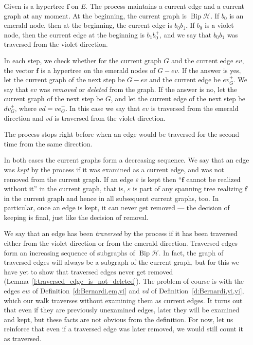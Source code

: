 \documentclass[ALCO,ThmDefs,Unicode,epreuves]{cedram}
\newcommand{\HH}{\mathcal H}
\DeclareMathOperator{\bip}{Bip}
\begin{document}
\begin{defi}
\label{d:Bernardi,vi,vi}
Given is a hypertree $\mathbf f$ on $E$. The process maintains a current edge and a current graph at any moment. At the beginning, the current graph is $\bip \HH$. If $b_0$ is an emerald node, then at the beginning, the current edge is $b_0b_1$. If $b_0$ is a violet node, then the current edge at the beginning is $b_1b_0^+$, and we say that $b_0b_1$ was traversed from the violet direction.

In each step, we check whether for the current graph $G$ and the current edge $ev$, the vector $\mathbf f$ is a hypertree on the emerald nodes of $G-ev$. If the answer is yes, let the current graph of the next step be $G-ev$ and the current edge be $ev_G^+$. We say that $ev$ was \emph{removed} or \emph{deleted} from the graph. If the answer is no, let the current graph of the next step be $G$, and let the current edge of the next step be $dv_G^+$, where $vd = ve_G^+$. In this case we say that $ev$ is traversed from the emerald direction and $vd$ is traversed from the violet direction.

The process stops right before when an edge would be traversed for the second time from the same direction.
\end{defi}

In both cases the current graphs form a decreasing sequence. We say that an edge was \emph{kept} by the process if it was examined as a current edge, and was not removed from the current graph. If an edge $\varepsilon$ is kept then ``$\mathbf f$ cannot be realized without it'' in the current graph, that is, $\varepsilon$ is part of any spanning tree realizing $\mathbf f$ in the current graph and hence in all subsequent current graphs, too. In particular, once an edge is kept, it can never get removed --- the decision of keeping is final, just like the decision of removal.

We say that an edge has been \emph{traversed} by the process if it has been traversed either from the violet direction or from the emerald direction. Traversed edges form an increasing sequence of subgraphs of $\bip\HH$. In fact, the graph of traversed edges will always be a subgraph of the current graph, but for this we have yet to show that traversed edges never get removed (\cf Lemma~\ref{l:traversed_edge_is_not_deleted}). The problem of course is with the edges $ew$ of Definition~\ref{d:Bernardi,em,vi} and $vd$ of Definition~\ref{d:Bernardi,vi,vi}, which our walk traverses without examining them as current edges. It turns out that even if they are previously unexamined edges, later they will be examined and kept, but these facts are not obvious from the definition. For now, let us reinforce that even if a traversed edge was later removed, we would still count it as traversed.
\end{document}
